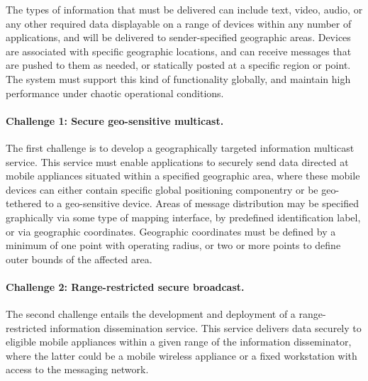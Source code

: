 \documentclass{sbir}
\begin{document}


The types of information that must be delivered can include text, video, audio, or any other required data displayable on a range of devices within any number of applications, and will be  delivered to sender-specified geographic areas. Devices are associated with specific geographic locations, and can receive messages that are pushed to them as needed, or statically posted at a specific region or point. The system must support this kind of functionality globally, and maintain high performance under chaotic operational conditions.

\paragraph{Challenge 1: Secure geo-sensitive multicast.} The first challenge is to develop a geographically targeted information multicast service. This service must enable applications to securely send data directed at mobile appliances situated within a specified geographic area, where these mobile devices can either contain specific global positioning componentry or be geo-tethered to a geo-sensitive device. Areas of message distribution may be specified graphically via some type of mapping interface, by predefined identification label, or via geographic coordinates. Geographic coordinates must be defined by a minimum of one point with operating radius, or two or more points to define outer bounds of the affected area.

\paragraph{Challenge 2: Range-restricted secure broadcast.} The second challenge entails the development and deployment of a range-restricted information dissemination service. This service delivers data securely to eligible mobile appliances within a given range of the information disseminator, where the latter could be a mobile wireless appliance or a fixed workstation with access to the messaging network.
\end{document}

